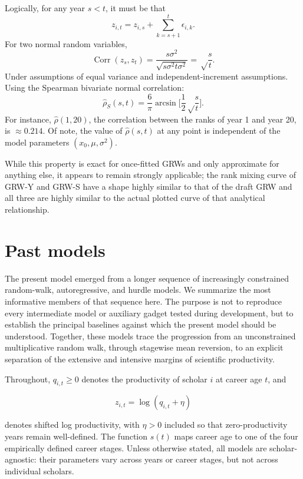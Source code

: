 \documentclass[twocolumn, letterpaper]{article}
\begin{document}
Logically, for any year $s<t$, it must be that
\[
    z_{i,t} = z_{i,s} + \sum_{k=s+1}^t \epsilon_{i,k}.
    \label{eq:sumwithk}
\]
For two normal random variables,
\begin{equation}
    \operatorname{Corr}(z_s, z_t) = \frac{s\sigma^2}{\sqrt{s\sigma^2t\sigma^2}} = \sqrt\frac{s}{t}.
    \label{eq:covariance}
\end{equation}
Under assumptions of equal variance and independent-increment assumptions.
Using the Spearman bivariate normal correlation:
\begin{equation}
    \hat{\rho}_S(s,t) = \frac{6}{\pi} \arcsin{\bigg[\frac{1}{2}\sqrt\frac{s}{t}\bigg]}.
    \label{eq:spearman_est_of_pearson}
\end{equation}
For instance, $\hat{\rho}(1,20)$, the correlation between the ranks of year 1 and year 20, is $\approx 0.214$. Of note, the value of $\hat{\rho}(s,t)$ at any point is independent of the model parameters $(x_0, \mu, \sigma^2)$.

While this property is exact for once-fitted GRWs and only approximate for anything else, it appears to remain strongly applicable; the rank mixing curve of GRW-Y and GRW-S have a shape highly similar to that of the draft GRW and all three are highly similar to the actual plotted curve of that analytical relationship.

\section{Past models}
\label{supp:past_models}

The present model emerged from a longer sequence of increasingly constrained random-walk, autoregressive, and hurdle models. We summarize the most informative members of that sequence here. The purpose is not to reproduce every intermediate model or auxiliary gadget tested during development, but to establish the principal baselines against which the present model should be understood. Together, these models trace the progression from an unconstrained multiplicative random walk, through stagewise mean reversion, to an explicit separation of the extensive and intensive margins of scientific productivity.

Throughout, \(q_{i,t}\geq 0\) denotes the productivity of scholar \(i\) at career age \(t\), and

\[
    z_{i,t}=\log(q_{i,t}+\eta)
\]

denotes shifted log productivity, with \(\eta>0\) included so that zero-productivity years remain well-defined. The function \(s(t)\) maps career age to one of the four empirically defined career stages. Unless otherwise stated, all models are scholar-agnostic: their parameters vary across years or career stages, but not across individual scholars.
\end{document}
